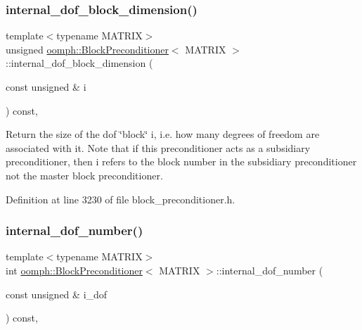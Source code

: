 \subsubsection{\texorpdfstring{internal\+\_\+dof\+\_\+block\+\_\+dimension()}{internal\_dof\_block\_dimension()}}
{\footnotesize\ttfamily template$<$typename M\+A\+T\+R\+IX$>$ \\
unsigned \hyperlink{classoomph_1_1BlockPreconditioner}{oomph\+::\+Block\+Preconditioner}$<$ M\+A\+T\+R\+IX $>$\+::internal\+\_\+dof\+\_\+block\+\_\+dimension (\begin{DoxyParamCaption}\item[{const unsigned \&}]{i }\end{DoxyParamCaption}) const\hspace{0.3cm}{\ttfamily [inline]}, {\ttfamily [protected]}}



Return the size of the dof \char`\"{}block\char`\"{} i, i.\+e. how many degrees of freedom are associated with it. Note that if this preconditioner acts as a subsidiary preconditioner, then i refers to the block number in the subsidiary preconditioner not the master block preconditioner. 



Definition at line 3230 of file block\+\_\+preconditioner.\+h.

\mbox{\label{classoomph_1_1BlockPreconditioner_abb4dff3469cc6718103fddfdf3f3a7bb}} 
\subsubsection{\texorpdfstring{internal\+\_\+dof\+\_\+number()}{internal\_dof\_number()}}
{\footnotesize\ttfamily template$<$typename M\+A\+T\+R\+IX$>$ \\
int \hyperlink{classoomph_1_1BlockPreconditioner}{oomph\+::\+Block\+Preconditioner}$<$ M\+A\+T\+R\+IX $>$\+::internal\+\_\+dof\+\_\+number (\begin{DoxyParamCaption}\item[{const unsigned \&}]{i\+\_\+dof }\end{DoxyParamCaption}) const\hspace{0.3cm}{\ttfamily [inline]}, {\ttfamily [protected]}}



